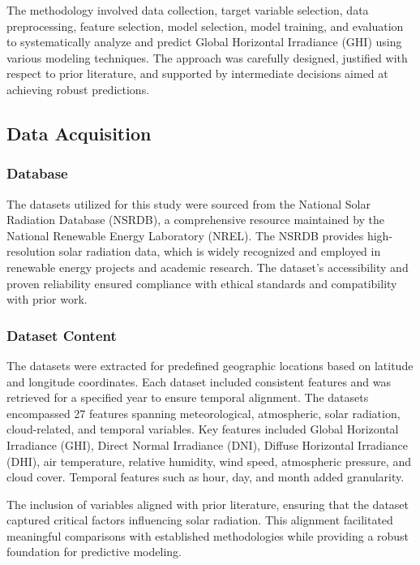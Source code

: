\documentclass[10pt,twocolumn]{article}
\begin{document}
\begin{itemize}
The methodology involved data collection, target variable selection, data preprocessing, feature selection, model selection, model training, and evaluation to systematically analyze and predict Global Horizontal Irradiance (GHI) using various modeling techniques. The approach was carefully designed, justified with respect to prior literature, and supported by intermediate decisions aimed at achieving robust predictions.

\subsection{Data Acquisition} 
\subsubsection{Database}
The datasets utilized for this study were sourced from the National Solar Radiation Database (NSRDB), a comprehensive resource maintained by the National Renewable Energy Laboratory (NREL). The NSRDB provides high-resolution solar radiation data, which is widely recognized and employed in renewable energy projects and academic research\cite{1}. The dataset's accessibility and proven reliability ensured compliance with ethical standards and compatibility with prior work.

\subsubsection{Dataset Content}
The datasets were extracted for predefined geographic locations based on latitude and longitude coordinates. Each dataset included consistent features and was retrieved for a specified year to ensure temporal alignment. The datasets encompassed 27 features spanning meteorological, atmospheric, solar radiation, cloud-related, and temporal variables. Key features included Global Horizontal Irradiance (GHI), Direct Normal Irradiance (DNI), Diffuse Horizontal Irradiance (DHI), air temperature, relative humidity, wind speed, atmospheric pressure, and cloud cover. Temporal features such as hour, day, and month added granularity.

The inclusion of variables aligned with prior literature, ensuring that the dataset captured critical factors influencing solar radiation. This alignment facilitated meaningful comparisons with established methodologies while providing a robust foundation for predictive modeling.


\end{itemize}
\end{document}
